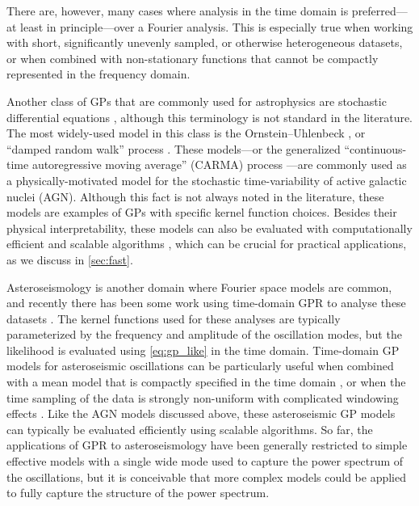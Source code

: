 \documentclass[letterpaper]{ar-1col}
\begin{document}
There are, however, many cases where analysis in the time domain is preferred---at least in principle---over a Fourier analysis.
This is especially true when working with short, significantly unevenly sampled, or otherwise heterogeneous datasets, or when combined with non-stationary functions that cannot be compactly represented in the frequency domain. 

Another class of GPs that are commonly used for astrophysics are stochastic differential equations \citep[see][for a detailed discussion of these models]{Sarkka:2019}, although this terminology is not standard in the literature.
The most widely-used model in this class is the Ornstein--Uhlenbeck \citep{1930PhRv...36..823U}, or ``damped random walk'' process \citep[e.g.,][]{2009ApJ...698..895K, 2010ApJ...708..927K, 2010ApJ...721.1014M, 2012A&A...546A..89B, 2020AJ....160..265H}.
These models---or the generalized ``continuous-time autoregressive moving average'' (CARMA) process \citep[e.g.,][]{2014ApJ...788...33K, celerite, 2022ApJ...936..132Y}---are commonly used as a physically-motivated model for the stochastic time-variability of active galactic nuclei (AGN).
Although this fact is not always noted in the literature, these models are examples of GPs with specific kernel function choices.
Besides their physical interpretability, these models can also be evaluated with computationally efficient and scalable algorithms \citep[e.g.,][]{2014ApJ...788...33K, celerite}, which can be crucial for practical applications, as we discuss in \autoref{sec:fast}.

Asteroseismology is another domain where Fourier space models are common, and recently there has been some work using time-domain GPR to analyse these datasets \citep[e.g.,][]{2017AJ....154..254G, 2018ApJ...865L..20F}.
The kernel functions used for these analyses are typically parameterized by the frequency and amplitude of the oscillation modes, but the likelihood is evaluated using \autoref{eq:gp_like} in the time domain.
Time-domain GP models for asteroseismic oscillations can be particularly useful when combined with a mean model that is compactly specified in the time domain \citep[e.g., a transiting planet,][]{2017AJ....154..254G}, or when the time sampling of the data is strongly non-uniform with complicated windowing effects \citep{2018ApJ...865L..20F}.
Like the AGN models discussed above, these asteroseismic GP models can typically be evaluated efficiently using scalable algorithms.
So far, the applications of GPR to asteroseismology have been generally restricted to simple effective models with a single wide mode used to capture the power spectrum of the oscillations, but it is conceivable that more complex models could be applied to fully capture the structure of the power spectrum.
\end{document}

